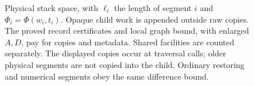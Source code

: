 \begin{figure}[t]
\caption{Physical stack space, with $\ell_i$ the length of segment $i$
and $\Phi_i=\Phi(w_i,t_i)$.  Opaque child work is appended outside raw
copies.  The proved record certificates and local graph bound, with
enlarged $A,D$, pay for copies and metadata.  Shared facilities are
counted separately.  The displayed copies occur at traversal calls;
older physical segments are not copied into the child.  Ordinary
restoring and numerical segments obey the same difference bound.}
\label{fig:ctrl-space}
\end{figure}

